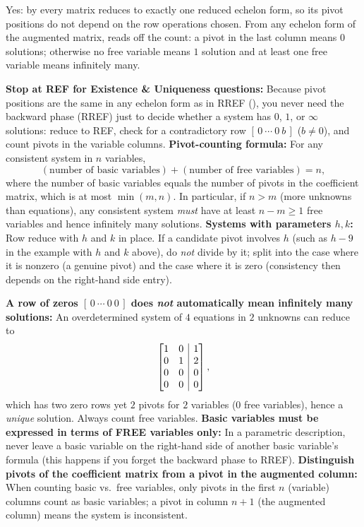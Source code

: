 \documentclass[10pt]{scrartcl}
\makeatletter
\newcommand{\aug}[2]{\left[\begin{array}{@{}#1@{}}#2\end{array}\right]}
\makeatother
\begin{document}
\revisit
Yes: by  every matrix reduces to exactly one reduced echelon form, so its pivot positions do not depend on the row operations chosen. From any echelon form of the augmented matrix,  reads off the count: a pivot in the last column means $0$ solutions; otherwise no free variable means $1$ solution and at least one free variable means infinitely many.

\begin{shortcuts}
  \ii \textbf{Stop at REF for Existence \& Uniqueness questions:} Because pivot positions are the same in any echelon form as in RREF (), you never need the backward phase (RREF) just to decide whether a system has $0$, $1$, or $\infty$ solutions: reduce to REF, check for a contradictory row $[\,0\ \cdots\ 0\ b\,]$ ($b\ne 0$), and count pivots in the variable columns.
  \ii \textbf{Pivot-counting formula:} For any consistent system in $n$ variables,
  \[
    (\text{number of basic variables}) + (\text{number of free variables}) = n,
  \]
  where the number of basic variables equals the number of pivots in the coefficient matrix, which is at most $\min(m,n)$. In particular, if $n>m$ (more unknowns than equations), any consistent system \emph{must} have at least $n-m\ge 1$ free variables and hence infinitely many solutions.
  \ii \textbf{Systems with parameters $h,k$:} Row reduce with $h$ and $k$ in place. If a candidate pivot involves $h$ (such as $h-9$ in the example with $h$ and $k$ above), do \emph{not} divide by it; split into the case where it is nonzero (a genuine pivot) and the case where it is zero (consistency then depends on the right-hand side entry).
\end{shortcuts}

\begin{trapbox}
  \ii \textbf{A row of zeros $[\,0\ \cdots\ 0\ 0\,]$ does \emph{not} automatically mean infinitely many solutions:} An overdetermined system of $4$ equations in $2$ unknowns can reduce to
  \[
    \aug{rr|r}{1&0&1\\0&1&2\\0&0&0\\0&0&0},
  \]
  which has two zero rows yet $2$ pivots for $2$ variables ($0$ free variables), hence a \emph{unique} solution. Always count free variables.
  \ii \textbf{Basic variables must be expressed in terms of FREE variables only:} In a parametric description, never leave a basic variable on the right-hand side of another basic variable's formula (this happens if you forget the backward phase to RREF).
  \ii \textbf{Distinguish pivots of the coefficient matrix from a pivot in the augmented column:} When counting basic vs.\ free variables, only pivots in the first $n$ (variable) columns count as basic variables; a pivot in column $n+1$ (the augmented column) means the system is inconsistent.
\end{trapbox}
\end{document}
